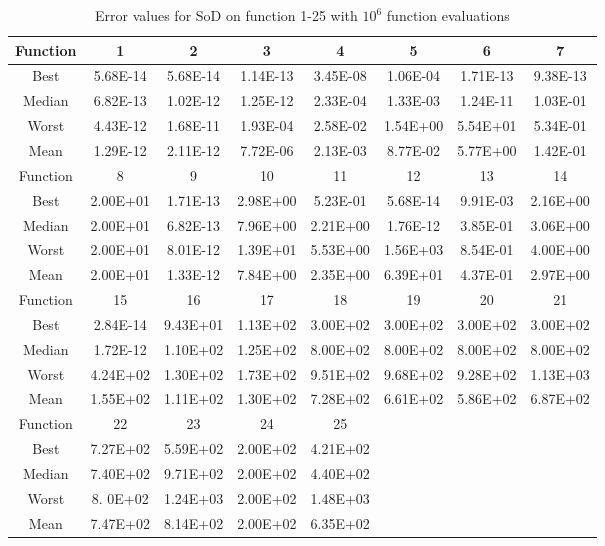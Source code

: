 \begin{table}[h]
\footnotesize
  \centering
\begin{tabular}{@{}cccccccc@{}}
\toprule
Function&1       &2       &3       &4       &5       &6       &7     \\ \midrule
Best    &5.68E-14&5.68E-14&1.14E-13&3.45E-08&1.06E-04&1.71E-13&9.38E-13 \\
Median  &6.82E-13&1.02E-12&1.25E-12&2.33E-04&1.33E-03&1.24E-11&1.03E-01\\
Worst   &4.43E-12&1.68E-11&1.93E-04&2.58E-02&1.54E+00&5.54E+01&5.34E-01\\
Mean    &1.29E-12&2.11E-12&7.72E-06&2.13E-03&8.77E-02&5.77E+00&1.42E-01\\\midrule
Function&8       &9       &10      &11      &12      &13      &14      \\\midrule
Best    &2.00E+01&1.71E-13&2.98E+00&5.23E-01&5.68E-14&9.91E-03&2.16E+00\\
Median  &2.00E+01&6.82E-13&7.96E+00&2.21E+00&1.76E-12&3.85E-01&3.06E+00 \\
Worst   &2.00E+01&8.01E-12&1.39E+01&5.53E+00&1.56E+03&8.54E-01&4.00E+00\\
Mean    &2.00E+01&1.33E-12&7.84E+00&2.35E+00&6.39E+01&4.37E-01&2.97E+00\\\midrule
Function&15      &16      &17      &18      &19      &20      &21\\\midrule
Best    &2.84E-14&9.43E+01&1.13E+02&3.00E+02&3.00E+02&3.00E+02&3.00E+02\\
Median  &1.72E-12&1.10E+02&1.25E+02&8.00E+02&8.00E+02&8.00E+02&8.00E+02\\
Worst   &4.24E+02&1.30E+02&1.73E+02&9.51E+02&9.68E+02&9.28E+02&1.13E+03\\
Mean    &1.55E+02&1.11E+02&1.30E+02&7.28E+02&6.61E+02&5.86E+02&6.87E+02\\\midrule
Function&22      &23      &24      &25&&&\\\midrule
Best    &7.27E+02&5.59E+02&2.00E+02&4.21E+02&&&\\
Median  &7.40E+02&9.71E+02&2.00E+02&4.40E+02&&&\\
Worst   &8. 0E+02&1.24E+03&2.00E+02&1.48E+03&&&\\
Mean    &7.47E+02&8.14E+02&2.00E+02&6.35E+02&&&\\\bottomrule
\end{tabular}
\caption{Error values for SoD on function 1-25 with $10^6$ function evaluations}
\label{table:errorSoD}
\end{table}

